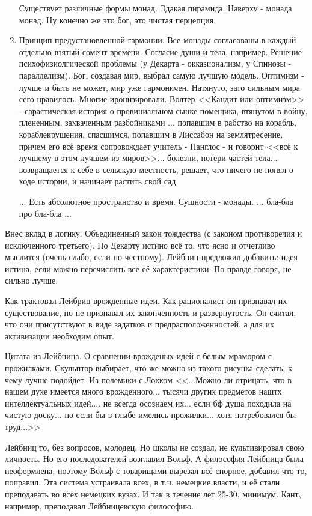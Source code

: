 \begin{enumerate}
	Существует различные формы монад. Эдакая пирамида. Наверху - монада монад. Ну конечно же это бог, это чистая перцепция.
	\item Принцип предустановленной гармонии. Все монады согласованы в каждый отдельно взятый сомент времени. Согласие души и тела, например. Решение психофизиолгической проблемы (у Декарта - окказионализм, у Спинозы - параллелизм). Бог, создавая мир, выбрал самую лучшую модель. Оптимизм - лучше и быть не может, мир уже гармоничен. Натянуто, зато сильным мира сего нравилось. Многие иронизировали. Волтер <<Кандит или оптимизм>> - сарастическая история о провиниальном сынке помещика, втянутом в войну, плененным, захваченным разбойниками ... попавшим в рабство на корабль, кораблекрушения, спасшимся, попавшим в Лиссабон на землятресение, причем его всё время сопровождает учитель - Панглос - и говорит <<всё к лучшему в этом лучшем из миров>>... болезни, потери частей тела... возвращается к себе в сельскую местность, решает, что ничего не понял о ходе истории, и начинает растить свой сад. 
	\item[...] Есть абсолютное пространство и время. Сущности - монады. ... бла-бла про бла-бла ...
\end{enumerate}

Внес вклад в логику. Объединенный закон тождества (с законом противоречия и исключенного третьего). По Декарту истино всё то, что ясно и отчетливо мыслится (очень слабо, если по честному). Лейбниц предложил добавить: идея истина, если можно перечислить все её характеристики. По правде говоря, не сильно лучше.

Как трактовал Лейбриц врожденные идеи. Как рационалист он признавал их существование, но не признавал их законченность и развернутость. Он считал, что они присутствуют в виде задатков и предрасположенностей, а для их активизации необходим опыт.

Цитата из Лейбница. О сравнении врожденых идей с белым мрамором с прожилками. Скульптор выбирает, что же можно из такого рисунка сделать, к чему лучше подойдет. Из полемики с Локком
<<...Можно ли отрицать, что в нашем духе имеется много врожденного... тысячи других предметов наштх интеллектуальных идей.... не всегда осознаем их... если бф душа походила на чистую доску... но если бы в глыбе имелись прожилки... хотя потребовался бы труд...>>

Лейбниц то, без вопросов, молодец. Но школы не создал, не культивировал свою личность. Но его последователей возглавил Вольф. А философия Лейбница была неоформлена, поэтому Вольф с товарищами вырезал всё спорное, добавил что-то, поправил. Эта система устраивала всех, в т.ч. немецкие власти, и её стали преподавать во всех немецких вузах. И так в течение лет 25-30, минимум. Кант, например, преподавал Лейбницевскую философию.
 